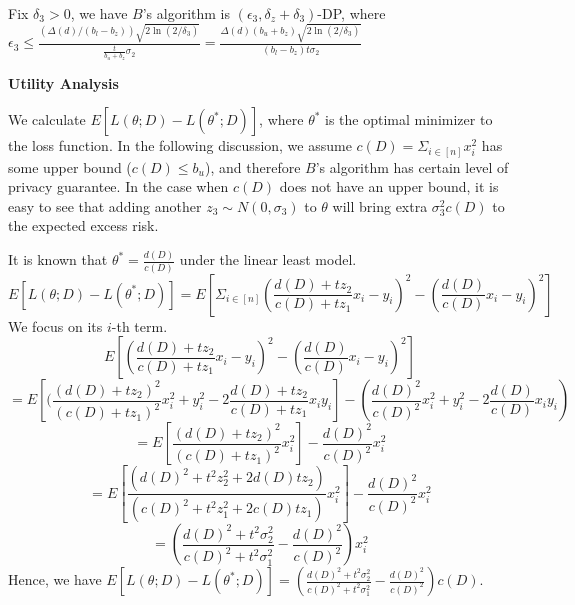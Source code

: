 \documentclass[11pt]{article}
\begin{document}
\begin{enumerate}
\begin{enumerate}
Fix $\delta_{3}>0$, we have $B$'s algorithm is $(\epsilon_{3}, \delta_{z}+\delta_{3})$-DP, where $\epsilon_{3} \leq  \frac{ (\Delta(d)/(b_{l}-b_{z})) \sqrt{2 \ln (2 / \delta_{3})} }{\frac{t}{b_{u} + b_{z}} \sigma_{2}} = \frac{\Delta(d)(b_{u} + b_{z}) \sqrt{2 \ln (2 / \delta_{3})}}{(b_{l}-b_{z})t \sigma_{2}}$
 \end{enumerate}
\end{enumerate}

{\bf Utility Analysis}

We calculate $E[L(\theta; D) - L(\theta^{*}; D)]$, where $\theta^{*}$ is the optimal minimizer to the loss function. In the following discussion, we assume $c(D)=\Sigma_{i\in [n]} x_{i}^{2}$ has some upper bound ($c(D) \leq b_{u}$), and therefore $B$'s algorithm has certain level of privacy guarantee. In the case when $c(D)$ does not have an upper bound, it is easy to see that adding another $z_{3} \sim N(0, \sigma_{3})$ to $\theta$ will bring extra $\sigma_{3}^{2}c(D)$ to the expected excess risk.

It is known that $\theta^{*} = \frac{d(D)}{c(D)}$ under the linear least model. 
\begin{equation}
E[L(\theta; D) - L(\theta^{*}; D)] = E[\Sigma_{i \in [n]} (\frac{d(D) +tz_{2}}{c(D)+tz_{1}}x_{i} - y_{i})^{2} -  (\frac{d(D) }{c(D)}x_{i} - y_{i})^{2}] 
\end{equation}
We focus on its $i$-th term. 
\begin{equation}
E[(\frac{d(D) +tz_{2}}{c(D)+tz_{1}}x_{i} - y_{i})^{2} -  (\frac{d(D) }{c(D)}x_{i} - y_{i})^{2}]
\end{equation}
\begin{equation}
=E [(\frac{(d(D) +tz_{2})^{2}}{(c(D)+tz_{1})^{2}}x_{i}^{2} + y_{i}^{2} -2\frac{d(D) +tz_{2}}{c(D)+tz_{1}}x_{i}y_{i}] - (\frac{d(D)^{2} }{c(D)^{2}}x_{i}^{2}+y_{i}^{2} - 2\frac{d(D) }{c(D)}x_{i}y_{i})
\end{equation}
\begin{equation}
=E[\frac{(d(D) +tz_{2})^{2}}{(c(D)+tz_{1})^{2}}x_{i}^{2}] - \frac{d(D)^{2} }{c(D)^{2}}x_{i}^{2}
\end{equation}
\begin{equation}
=E[\frac{(d(D)^{2} +t^{2}z_{2}^{2}+2d(D)tz_{2})}{(c(D)^{2} +t^{2}z_{1}^{2}+2c(D)tz_{1})}x_{i}^{2}]- \frac{d(D)^{2} }{c(D)^{2}}x_{i}^{2}
\end{equation}
\begin{equation}
=(\frac{d(D)^{2} +t^{2}\sigma_{2}^{2}}{c(D)^{2} +t^{2}\sigma_{1}^{2}}- \frac{d(D)^{2} }{c(D)^{2}})x_{i}^{2}
\end{equation}
Hence, we have $E[L(\theta; D) - L(\theta^{*}; D)] = (\frac{d(D)^{2} +t^{2}\sigma_{2}^{2}}{c(D)^{2} +t^{2}\sigma_{1}^{2}}- \frac{d(D)^{2} }{c(D)^{2}}) c(D)$.
\end{document}
